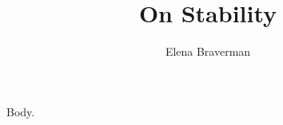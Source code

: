 \documentclass{tpabsstore}
\begin{document}
\title{On Stability}
\author{Elena Braverman}
\maketitle
Body.
\end{document}
